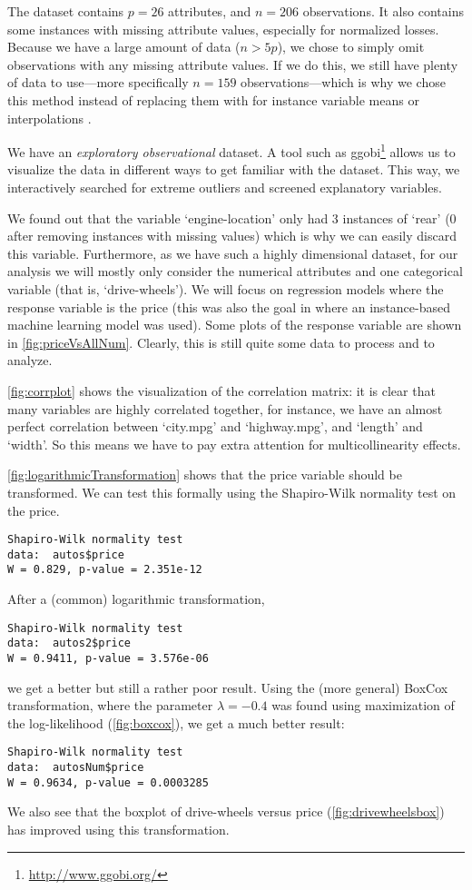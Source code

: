 
The dataset contains $p=26$ attributes, and $n=206$ observations. It also contains some instances with missing attribute values, especially for normalized losses. Because we have a large amount of data ($n>5p$), we chose to simply omit observations with any missing attribute values. If we do this, we still have plenty of data to use---more specifically $n=159$ observations---which is why we chose this method instead of replacing them with for instance variable means or interpolations \cite{missingvalues}.

We have an \emph{exploratory observational} dataset. A tool such as ggobi\footnote{\url{http://www.ggobi.org/}} allows us to visualize the data in different ways to get familiar with the dataset. This way, we interactively searched for extreme outliers and screened explanatory variables.

We found out that the variable `engine-location' only had 3 instances of `rear' (0 after removing instances with missing values) which is why we can easily discard this variable. Furthermore, as we have such a highly dimensional dataset, for our analysis we will mostly only consider the numerical attributes and one categorical variable (that is, `drive-wheels'). We will focus on regression models where the response variable is the price (this
was also the goal in \cite{kibbler} where an instance-based machine learning model was used). Some plots of the response variable are shown in \autoref{fig:priceVsAllNum}. Clearly, this is still quite some data to process and to analyze.

\autoref{fig:corrplot} shows the visualization of the correlation matrix: it is clear that many variables are highly correlated together, for instance, we have an almost perfect correlation between `city.mpg' and `highway.mpg', and `length' and `width'. So this means we have to pay extra attention for multicollinearity effects. %

\autoref{fig:logarithmicTransformation} shows that the price variable should be transformed. We can test this formally using the Shapiro-Wilk normality test on the price.
\begin{verbatim}
Shapiro-Wilk normality test
data:  autos$price
W = 0.829, p-value = 2.351e-12
\end{verbatim}
After a (common) logarithmic transformation,
\begin{verbatim}
Shapiro-Wilk normality test
data:  autos2$price
W = 0.9411, p-value = 3.576e-06
\end{verbatim}
we get a better but still a rather poor result. Using the (more general) BoxCox transformation, where the parameter $\lambda=-0.4$ was found using maximization of the log-likelihood (\autoref{fig:boxcox}), we get a much better result:
\begin{verbatim}
Shapiro-Wilk normality test
data:  autosNum$price
W = 0.9634, p-value = 0.0003285
\end{verbatim}

We also see that the boxplot of drive-wheels versus price (\autoref{fig:drivewheelsbox}) has improved using this transformation.
